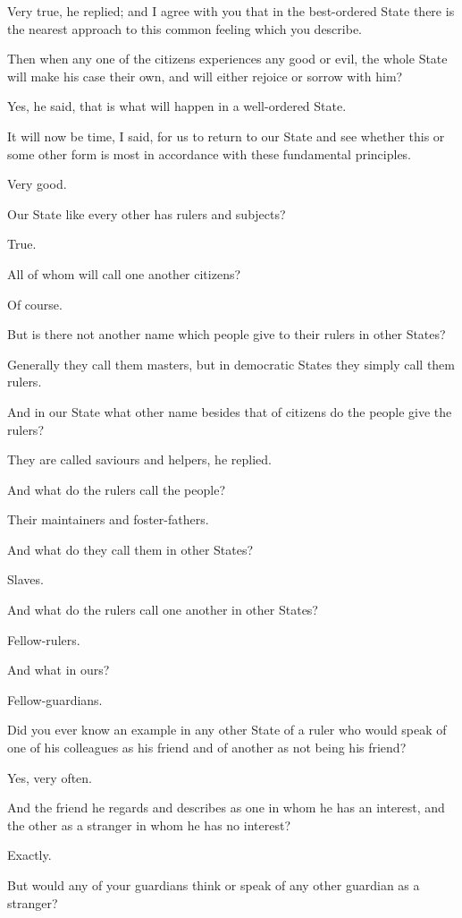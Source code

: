 Very true, he replied; and I agree with you that in the best-ordered
State there is the nearest approach to this common feeling which you
describe.

Then when any one of the citizens experiences any good or evil, the
whole State will make his case their own, and will either rejoice or
sorrow with him?

Yes, he said, that is what will happen in a well-ordered State.

It will now be time, I said, for us to return to our State and see
whether this or some other form is most in accordance with these
fundamental principles.

Very good.

Our State like every other has rulers and subjects?

True.

All of whom will call one another citizens?

Of course.

But is there not another name which people give to their rulers in other
States?

Generally they call them masters, but in democratic States they simply
call them rulers.

And in our State what other name besides that of citizens do the people
give the rulers?

They are called saviours and helpers, he replied.

And what do the rulers call the people?

Their maintainers and foster-fathers.

And what do they call them in other States?

Slaves.

And what do the rulers call one another in other States?

Fellow-rulers.

And what in ours?

Fellow-guardians.

Did you ever know an example in any other State of a ruler who would
speak of one of his colleagues as his friend and of another as not being
his friend?

Yes, very often.

And the friend he regards and describes as one in whom he has an
interest, and the other as a stranger in whom he has no interest?

Exactly.

But would any of your guardians think or speak of any other guardian as
a stranger?

